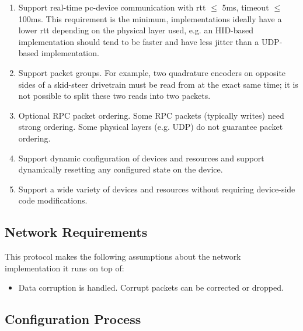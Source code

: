 \documentclass{article}
\begin{document}
\begin{enumerate}
    \item Support real-time \gls{pc}-\gls{device} communication with \gls{rtt} $\leq$ 5ms, timeout
    $\leq$ 100ms. This requirement is the minimum, implementations ideally have a lower \gls{rtt}
    depending on the physical layer used, e.g. an HID-based implementation should tend to be faster
    and have less jitter than a UDP-based implementation.

    \item Support packet \glspl{group}. For example, two quadrature encoders on opposite sides of a
    skid-steer drivetrain must be read from at the exact same time; it is not possible to split
    these two reads into two packets.

    \item Optional RPC packet ordering. Some RPC packets (typically writes) need strong ordering.
    Some physical layers (e.g. UDP) do not guarantee packet ordering.

    \item Support dynamic configuration of \glspl{device} and \glspl{resource} and support
    dynamically resetting any configured state on the \gls{device}.

    \item Support a wide variety of \glspl{device} and \glspl{resource} without requiring
    \gls{device}-side code modifications.
\end{enumerate}

\subsection{Network Requirements}

This protocol makes the following assumptions about the network implementation it runs on top of:
\begin{itemize}
    \item Data corruption is handled. Corrupt packets can be corrected or dropped.
\end{itemize}

\subsection{Configuration Process}
\end{document}
